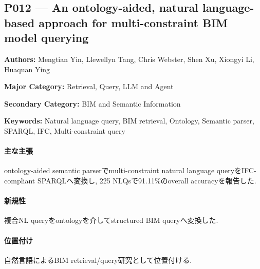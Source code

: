 \subsection{P012 --- An ontology-aided, natural language-based approach for multi-constraint BIM model querying}
\label{paper:P012}
\textbf{Authors:} Mengtian Yin, Llewellyn Tang, Chris Webster, Shen Xu, Xiongyi Li, Huaquan Ying\par
\textbf{Major Category:} Retrieval, Query, LLM and Agent\par
\textbf{Secondary Category:} BIM and Semantic Information\par
\textbf{Keywords:} Natural language query, BIM retrieval, Ontology, Semantic parser, SPARQL, IFC, Multi-constraint query\par
\paragraph{主な主張}
ontology-aided semantic parserでmulti-constraint natural language queryをIFC-compliant SPARQLへ変換し, 225 NLQsで91.11\%のoverall accuracyを報告した. \cite{Yin:2023OntologyBIMQuery}
\paragraph{新規性}
複合NL queryをontologyを介してstructured BIM queryへ変換した.
\paragraph{位置付け}
自然言語によるBIM retrieval/query研究として位置付ける.
